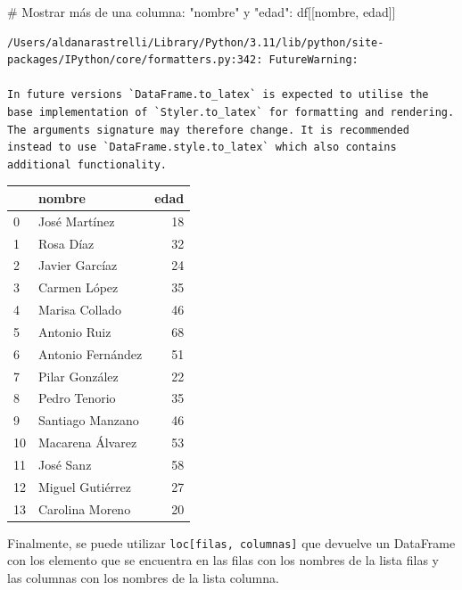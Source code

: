 \documentclass[
  letterpaper,
  DIV=11,
  numbers=noendperiod]{scrreprt}
\newenvironment{Shaded}{\begin{snugshade}}{\end{snugshade}}
\newcommand{\CommentTok}[1]{\textcolor[rgb]{0.37,0.37,0.37}{#1}}
\newcommand{\NormalTok}[1]{\textcolor[rgb]{0.00,0.23,0.31}{#1}}
\newcommand{\StringTok}[1]{\textcolor[rgb]{0.13,0.47,0.30}{#1}}
\begin{document}
\begin{Shaded}
\begin{Highlighting}[]
\CommentTok{\# Mostrar más de una columna: "nombre" y "edad":}
\NormalTok{df[[}\StringTok{\textquotesingle{}nombre\textquotesingle{}}\NormalTok{, }\StringTok{\textquotesingle{}edad\textquotesingle{}}\NormalTok{]]}
\end{Highlighting}
\end{Shaded}

\begin{verbatim}
/Users/aldanarastrelli/Library/Python/3.11/lib/python/site-packages/IPython/core/formatters.py:342: FutureWarning:

In future versions `DataFrame.to_latex` is expected to utilise the base implementation of `Styler.to_latex` for formatting and rendering. The arguments signature may therefore change. It is recommended instead to use `DataFrame.style.to_latex` which also contains additional functionality.
\end{verbatim}

\begin{tabular}{llr}
\toprule
{} &             nombre &  edad \\
\midrule
0  &      José Martínez &    18 \\
1  &          Rosa Díaz &    32 \\
2  &     Javier Garcíaz &    24 \\
3  &       Carmen López &    35 \\
4  &     Marisa Collado &    46 \\
5  &       Antonio Ruiz &    68 \\
6  &  Antonio Fernández &    51 \\
7  &     Pilar González &    22 \\
8  &      Pedro Tenorio &    35 \\
9  &   Santiago Manzano &    46 \\
10 &   Macarena Álvarez &    53 \\
11 &          José Sanz &    58 \\
12 &   Miguel Gutiérrez &    27 \\
13 &    Carolina Moreno &    20 \\
\bottomrule
\end{tabular}

Finalmente, se puede utilizar \texttt{loc{[}filas,\ columnas{]}} que
devuelve un DataFrame con los elemento que se encuentra en las filas con
los nombres de la lista filas y las columnas con los nombres de la lista
columna.
\end{document}
